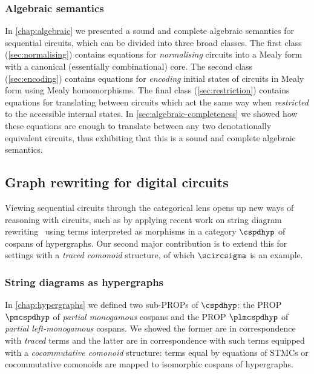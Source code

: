 \subsubsection{Algebraic semantics}

In \cref{chap:algebraic} we presented a sound and complete algebraic semantics
for sequential circuits, which can be divided into three broad classes.
The first class (\cref{sec:normalising}) contains equations for
\emph{normalising} circuits into a Mealy form with a canonical (essentially
combinational) core.
The second class (\cref{sec:encoding}) contains equations for \emph{encoding}
initial states of circuits in Mealy form using Mealy homomorphisms.
The final class (\cref{sec:restriction}) contains equations for translating
between circuits which act the same way when \emph{restricted} to the
accessible internal states.
In \cref{sec:algebraic-completeness} we showed how these equations are enough to
translate between any two denotationally equivalent circuits, thus exhibiting
that this is a sound and complete algebraic semantics.

\subsection{Graph rewriting for digital circuits}

Viewing sequential circuits through the categorical lens opens up new ways of
reasoning with circuits, such as by applying recent work on string diagram
rewriting~\cite{bonchi2022string,bonchi2022stringa} using terms interpreted as
morphisms in a category \(\cspdhyp\) of cospans of hypergraphs.
Our second major contribution is to extend this for settings with a
\emph{traced comonoid} structure, of which \(\scircsigma\) is an example.

\subsubsection{String diagrams as hypergraphs}

In \cref{chap:hypergraphs} we defined two sub-PROPs of \(\cspdhyp\):
the PROP \(\pmcspdhyp\) of \emph{partial monogamous} cospans and
the PROP \(\plmcspdhyp\) of \emph{partial left-monogamous} cospans.
We showed the former are in correspondence with \emph{traced} terms and the
latter are in correspondence with such terms equipped with a
\emph{cocommutative comonoid} structure: terms equal by equations of STMCs or
cocommutative comonoids are mapped to isomorphic cospans of hypergraphs.

